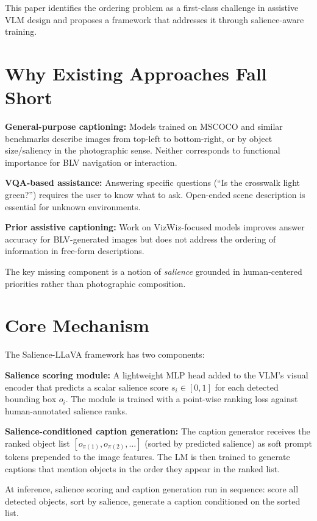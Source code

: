 \documentclass[10pt,twocolumn]{article}
\begin{document}
This paper identifies the ordering problem as a first-class challenge in
assistive VLM design and proposes a framework that addresses it through
salience-aware training.

\section{Why Existing Approaches Fall Short}

\textbf{General-purpose captioning:} Models trained on MSCOCO and
similar benchmarks describe images from top-left to bottom-right, or
by object size/saliency in the photographic sense. Neither corresponds
to functional importance for BLV navigation or interaction.

\textbf{VQA-based assistance:} Answering specific questions (``Is the
crosswalk light green?'') requires the user to know what to ask. Open-ended
scene description is essential for unknown environments.

\textbf{Prior assistive captioning:} Work on VizWiz-focused models
improves answer accuracy for BLV-generated images but does not address
the ordering of information in free-form descriptions.

The key missing component is a notion of \emph{salience} grounded in
human-centered priorities rather than photographic composition.

\section{Core Mechanism}

The Salience-LLaVA framework has two components:

\textbf{Salience scoring module:} A lightweight MLP head added to the
VLM's visual encoder that predicts a scalar salience score $s_i \in [0,1]$
for each detected bounding box $o_i$. The module is trained with a
point-wise ranking loss against human-annotated salience ranks.

\textbf{Salience-conditioned caption generation:} The caption generator
receives the ranked object list $[o_{\pi(1)}, o_{\pi(2)}, \ldots]$
(sorted by predicted salience) as soft prompt tokens prepended to the
image features. The LM is then trained to generate captions that mention
objects in the order they appear in the ranked list.

At inference, salience scoring and caption generation run in sequence:
score all detected objects, sort by salience, generate a caption
conditioned on the sorted list.
\end{document}
